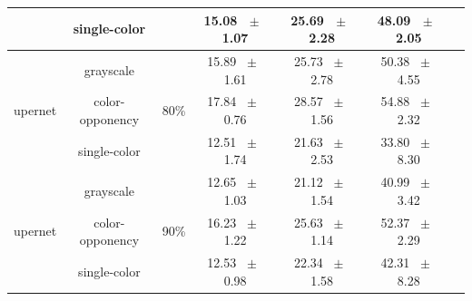 \begin{table}[h]
\begin{tabular}{@{}lccc ccc@{}}
    & single-color & & 15.08 ~$\pm$~ 1.07 & 25.69 ~$\pm$~ 2.28 & 48.09 ~$\pm$~ 2.05 \\
    \midrule
    \multirow{3}{*}{upernet} & grayscale & \multirow{3}{*}{80\%} & 15.89 ~$\pm$~ 1.61 & 25.73 ~$\pm$~ 2.78 & 50.38 ~$\pm$~ 4.55 \\
    & color-opponency & & 17.84 ~$\pm$~ 0.76 & 28.57 ~$\pm$~ 1.56 & 54.88 ~$\pm$~ 2.32 \\
    & single-color & & 12.51 ~$\pm$~ 1.74 & 21.63 ~$\pm$~ 2.53 & 33.80 ~$\pm$~ 8.30 \\
    \midrule
    \multirow{3}{*}{upernet} & grayscale & \multirow{3}{*}{90\%} & 12.65 ~$\pm$~ 1.03 & 21.12 ~$\pm$~ 1.54 & 40.99 ~$\pm$~ 3.42 \\
    & color-opponency & & 16.23 ~$\pm$~ 1.22 & 25.63 ~$\pm$~ 1.14 & 52.37 ~$\pm$~ 2.29 \\
    & single-color & & 12.53 ~$\pm$~ 0.98 & 22.34 ~$\pm$~ 1.58 & 42.31 ~$\pm$~ 8.28 \\
    \midrule
    \bottomrule
  \end{tabular}
  \label{tab:sparse_upernet_acdc_night}
\end{table}